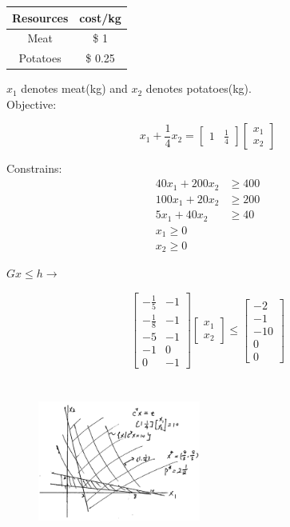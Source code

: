 \begin{tabular}{|c|c|}
	\hline 
	Resources&cost/kg\\
	\hline  
	Meat &\$ 1\\
	\hline 
	Potatoes &\$ 0.25\\
	\hline 
\end{tabular}

$x_1$ denotes meat(kg) and $x_2$ denotes potatoes(kg).\\


Objective:

\begin{equation*}
x_1 + \frac{1}{4}x_2 = 
\begin{bmatrix}
1 & \frac{1}{4}
\end{bmatrix}
\begin{bmatrix}
x_1\\
x_2
\end{bmatrix}
\end{equation*}

Constrains:
\begin{align*}
40x_1 + 200x_2 &\geq 400\\
100x_1 + 20x_2 &\geq 200\\
5x_1 + 40x_2 &\geq 40\\
x_1 \geq 0\\
x_2 \geq 0
\end{align*}

$Gx\leq h \rightarrow$ 

\begin{equation*}
\begin{bmatrix}
-\frac{1}{5} & -1\\
-\frac{1}{8} & -1\\
-5 & -1\\
-1 & 0\\
0 & -1
\end{bmatrix}
\begin{bmatrix}
x_1\\
x_2
\end{bmatrix}\leq
\begin{bmatrix}
-2\\
-1\\
-10\\
0\\
0
\end{bmatrix}
\end{equation*}

\begin{figure}
	\centering
	\includegraphics[width=2.1in,height=2.1in]{figures/ch06/figure5.png}
\end{figure}

